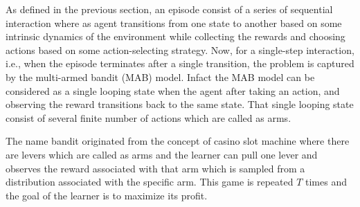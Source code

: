 As defined in the previous section, an episode consist of a series of sequential interaction where as agent transitions from one state to another based on some intrinsic dynamics of the environment while collecting the rewards and choosing actions based on some action-selecting strategy. Now, for a single-step interaction, i.e., when the episode terminates after a single transition, the problem is captured by the multi-armed bandit (MAB) model. Infact the MAB model can be considered as a single looping state when the agent after taking an action, and observing the reward transitions back to the same state. That single looping state consist of several finite number of actions which are called as arms.

	The name bandit originated from the concept of casino slot machine where there are levers which are called as arms and the learner can pull one lever and observes the reward associated with that arm which is sampled from a distribution associated with the specific arm. This game is repeated $T$ times and the goal of the learner is to maximize its profit. 

